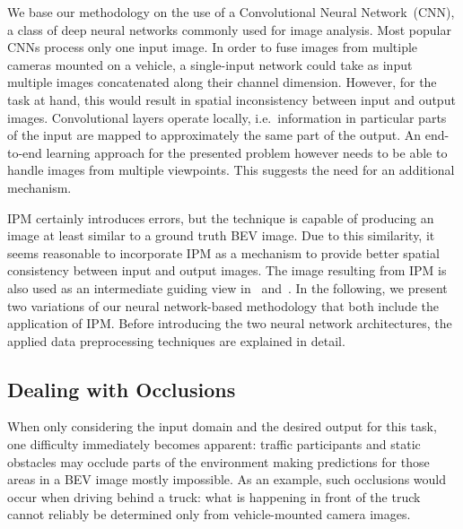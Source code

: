 \documentclass[a4paper, 10pt, conference]{ieeeconf}
\begin{document}
We base our methodology on the use of a Convolutional Neural Network~(CNN), a class of deep neural networks commonly used for image analysis. Most popular CNNs process only one input image. In order to fuse images from multiple cameras mounted on a vehicle, a single-input network could take as input multiple images concatenated along their channel dimension. However, for the task at hand, this would result in spatial inconsistency between input and output images. Convolutional layers operate locally, i.e.\ information in particular parts of the input are mapped to approximately the same part of the output. An end-to-end learning approach for the presented problem however needs to be able to handle images from multiple viewpoints. This suggests the need for an additional mechanism.

IPM certainly introduces errors, but the technique is capable of producing an image at least similar to a ground truth BEV image. Due to this similarity, it seems reasonable to incorporate IPM as a mechanism to provide better spatial consistency between input and output images. The image resulting from IPM is also used as an intermediate guiding view in~\cite{BrulsEtAl_RightAngledPerspective_2019} and~\cite{ZhuEtAl_GenerativeAdversarialFrontal_2019}. In the following, we present two variations of our neural network-based methodology that both include the application of IPM. Before introducing the two neural network architectures, the applied data preprocessing techniques are explained in detail.

\subsection{Dealing with Occlusions}

When only considering the input domain and the desired output for this task, one difficulty immediately becomes apparent: traffic participants and static obstacles may occlude parts of the environment making predictions for those areas in a BEV image mostly impossible. As an example, such occlusions would occur when driving behind a truck: what is happening in front of the truck cannot reliably be determined only from vehicle-mounted camera images.
\end{document}
